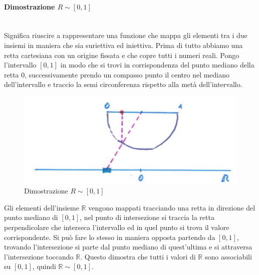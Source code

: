 \documentclass{article}
\begin{document}
\paragraph{Dimostrazione $R\sim[0,1]$}\mbox{}\\
Significa riuscire a rappresentare una funzione
che mappa gli elementi tra i due insiemi in maniera che sia suriettiva ed iniettiva.
Prima di tutto abbiamo una retta cartesiana con un origine fissata e che copre tutti i numeri reali.
Pongo l'intervallo $[0,1]$ in modo che si trovi in corrispondenza del punto mediano della retta $0$,
successivamente prendo un compasso punto il centro nel mediano dell'intervallo e traccio la
semi circonferenza rispetto alla metà dell'intervallo.
\begin{figure}[H]
    \centering
    \includegraphics[scale=0.5]{images/dim_1.png}
    \caption{Dimostrazione  $R\sim[0,1]$}
\end{figure}
Gli elementi dell'insieme $\mathbb{R}$ vengono mappati tracciando una retta in direzione del punto
mediano di $[0,1]$, nel punto di intersezione si traccia la retta perpendicolare che interseca
l'intervallo ed in quel punto si trova il valore corrispondente. Si può fare lo stesso
in maniera opposta partendo da $[0,1]$, trovando l'intersezione si parte dal punto mediano
di quest'ultima e si attraversa l'intersezione toccando $\mathbb{R}$.
Questo dimostra che tutti i valori di $\mathbb{R}$ sono associabili
su $[0,1]$, quindi $\mathbb{R}\sim[0,1]$.
\end{document}
